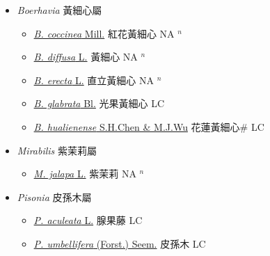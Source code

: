
  \begin{itemize}
 \item[] \textit{Boerhavia} 黃細心屬
                    
  \begin{itemize}
        \item[] \href{http://www.theplantlist.org/tpl1.1/search?q=Boerhavia+coccinea}{\textit{B. coccinea} Mill.}   紅花黃細心 NA $^n$
        \item[] \href{http://www.theplantlist.org/tpl1.1/search?q=Boerhavia+diffusa}{\textit{B. diffusa} L.}   黃細心 NA $^n$
        \item[] \href{http://www.theplantlist.org/tpl1.1/search?q=Boerhavia+erecta}{\textit{B. erecta} L.}   直立黃細心 NA $^n$
        \item[] \href{http://www.theplantlist.org/tpl1.1/search?q=Boerhavia+glabrata}{\textit{B. glabrata} Bl.}   光果黃細心 LC
        \item[] \href{http://www.theplantlist.org/tpl1.1/search?q=Boerhavia+hualienense}{\textit{B. hualienense} S.H.Chen \& M.J.Wu}   花蓮黃細心\# LC
  \end{itemize}
 \item[] \textit{Mirabilis} 紫茉莉屬
                    
  \begin{itemize}
        \item[] \href{http://www.theplantlist.org/tpl1.1/search?q=Mirabilis+jalapa}{\textit{M. jalapa} L.}   紫茉莉 NA $^n$
  \end{itemize}
 \item[] \textit{Pisonia} 皮孫木屬
                    
  \begin{itemize}
        \item[] \href{http://www.theplantlist.org/tpl1.1/search?q=Pisonia+aculeata}{\textit{P. aculeata} L.}   腺果藤 LC
        \item[] \href{http://www.theplantlist.org/tpl1.1/search?q=Pisonia+umbellifera}{\textit{P. umbellifera} (Forst.) Seem.}   皮孫木 LC
  \end{itemize}
  \end{itemize}
